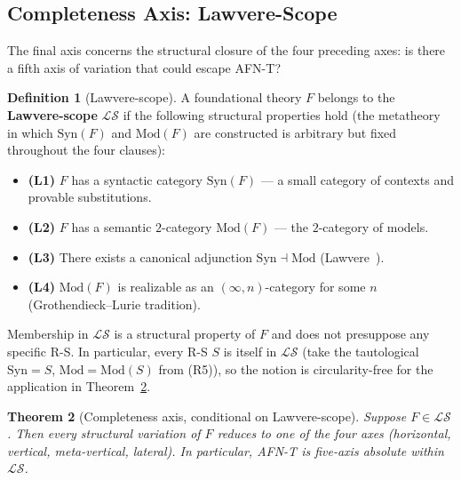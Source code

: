\documentclass[11pt]{article}
\theoremstyle{plain}
\newtheorem{theorem}{Theorem}[section]
\theoremstyle{definition}
\newtheorem{definition}[theorem]{Definition}
\newcommand{\cS}{\mathcal{S}}
\newcommand{\cL}{\mathcal{L}}
\newcommand{\Syn}{\mathrm{Syn}}
\newcommand{\Mod}{\mathrm{Mod}}
\begin{document}
\subsection{Completeness Axis: Lawvere-Scope}\label{sec:completeness-axis}

The final axis concerns the structural closure of the four preceding axes: is there a fifth axis of variation that could escape AFN-T?

\begin{definition}[Lawvere-scope]\label{def:law-scope}
A foundational theory $F$ belongs to the \textbf{Lawvere-scope} $\cL\cS$ if the following structural properties hold (the metatheory in which $\Syn(F)$ and $\Mod(F)$ are constructed is arbitrary but fixed throughout the four clauses):
\begin{itemize}
\item \textbf{(L1)} $F$ has a syntactic category $\Syn(F)$ --- a small category of contexts and provable substitutions.
\item \textbf{(L2)} $F$ has a semantic $2$-category $\Mod(F)$ --- the $2$-category of models.
\item \textbf{(L3)} There exists a canonical adjunction $\Syn \dashv \Mod$ (Lawvere~\cite{Lawvere1969}).
\item \textbf{(L4)} $\Mod(F)$ is realizable as an $(\infty, n)$-category for some $n$ (Grothendieck--Lurie tradition).
\end{itemize}
Membership in $\cL\cS$ is a structural property of $F$ and does not presuppose any specific R-S. In particular, every R-S $S$ is itself in $\cL\cS$ (take the tautological $\Syn = S$, $\Mod = \Mod(S)$ from (R5)), so the notion is circularity-free for the application in Theorem~\ref{thm:completeness}.
\end{definition}

\begin{theorem}[Completeness axis, conditional on Lawvere-scope]\label{thm:completeness}
Suppose $F \in \cL\cS$. Then every structural variation of $F$ reduces to one of the four axes (horizontal, vertical, meta-vertical, lateral). In particular, AFN-T is five-axis absolute within $\cL\cS$.
\end{theorem}
\end{document}
